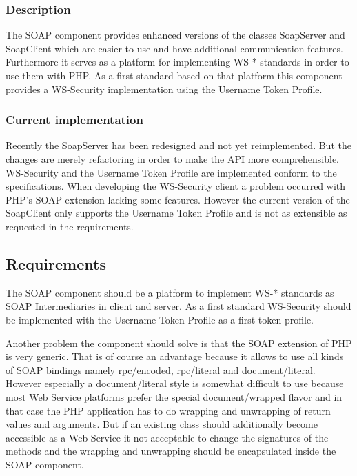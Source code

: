 \documentclass[10pt,final,a4paper,oneside]{article}
\begin{document}
\subsubsection{Description}
The SOAP component provides enhanced versions of
the classes SoapServer and SoapClient
which are easier to use and have additional
communication features.
Furthermore it serves as a platform for implementing
WS-* standards in order to use them with PHP.
As a first standard based on that platform
this component provides a WS-Security implementation
using the Username Token Profile.


\subsubsection{Current implementation}
Recently the SoapServer has been redesigned
and not yet reimplemented.
But the changes are merely refactoring
in order to make the API more comprehensible.
WS-Security and the Username Token Profile
are implemented conform to the specifications.
When developing the WS-Security client a
problem occurred with PHP's SOAP extension
lacking some features.
However the current version of the SoapClient only supports the
Username Token Profile and is not as extensible
as requested in the requirements. 


\subsection{Requirements}\label{subsec:SOAPRequirements}
The SOAP component should be
a platform to implement WS-* standards
as SOAP Intermediaries in client and server.
As a first standard WS-Security should be implemented
with the Username Token Profile as a first token profile.

Another problem the component should solve
is that the SOAP extension of PHP is very generic.
That is of course an advantage because it allows
to use all kinds of SOAP bindings namely
rpc/encoded, rpc/literal and document/literal.
However especially a document/literal style
is somewhat difficult to use because most
Web Service platforms prefer the special
document/wrapped flavor and in that case
the PHP application has to do wrapping and
unwrapping of return values and arguments.
But if an existing class should additionally
become accessible as a Web Service
it not acceptable to change the signatures
of the methods and the wrapping and unwrapping
should be encapsulated inside the SOAP component.
\end{document}
